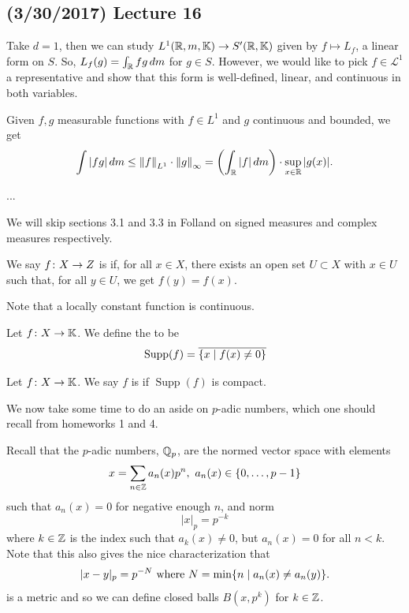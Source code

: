 \documentclass[11pt,leqno,oneside]{amsbook}
\numberwithin{thm}{section}
\newcommand{\cL}{\mathcal{L}}
\newcommand{\K}{\mathbb{K}} %
\newcommand{\supp}{\operatorname{Supp}}
\begin{document}
\subsection*{(3/30/2017) Lecture 16}
Take \(d=1\), then we can study \(L^1(\R,m,\K) \to S'(\R,\K)\) given
by \(f \mapsto L_f\), a linear form on \(S\). So, \(L_f(g) = \int_\R
fg \d m\) for \(g \in S\). However, we would like to pick \(f \in
\cL^1\) a representative and show that this form is well-defined, linear,
and continuous in both variables. 
\begin{prop}\label{L1-Linf-bound-1}
  Given \(f,g\) measurable functions with \(f \in L^1\) and \(g\)
  continuous and bounded, we get \[
    \int |fg| \d m \leq \norm[f]_{L^1} \cdot \norm[g]_\infty =
    \left(\int_\R |f| \d m\right) \cdot \sup_{x \in \R} |g(x)|.
  \]
\end{prop}
...
\begin{rmk}
  We will skip sections 3.1 and 3.3 in Folland on signed measures and
  complex measures respectively.
\end{rmk}
\begin{defn}
  We say \(f \from X \to Z\) is  if, for all \(x \in
  X\), there exists an open set \(U \subset X\) with \(x \in U\) such
  that, for all \(y \in U\), we get \(f(y) = f(x)\).
\end{defn}
Note that a locally constant function is continuous.
\begin{defn}
  Let \(f \from X \to \K\). We define the  to
  be \[
    \supp(f) = \ov{\{x \st f(x) \neq 0\}}
  \]
\end{defn}
\begin{defn}
  Let \(f \from X \to \K\). We say \(f\) is 
  if \(\supp(f)\) is compact.
\end{defn}
We now take some time to do an aside on \(p\)-adic numbers, which one
should recall from homeworks 1 and 4.
\begin{defn}
  Recall that the \(p\)-adic numbers, \(\Q_p\), are the normed vector
  space with elements \[
    x = \sum_{n \in \Z} a_n(x) p^n, \ a_n(x) \in \{0, \ldots, p-1\}
  \]
  such that \(a_n(x) = 0\) for negative enough \(n\), and norm \[
    |x|_p = p^{-k}
  \]
  where \(k \in \Z\) is the index such that \(a_k(x) \neq 0\), but
  \(a_n(x) = 0\) for all \(n < k\). Note that this also gives the nice
  characterization that \[
    |x-y|_p = p^{-N} \text{ where } N = \min\{n \st a_n(x) \neq a_n(y)\}.
  \]
  is a metric and so we can define closed balls \(B(x,p^k)\) for \(k
  \in \Z\).
\end{defn}
\end{document}
